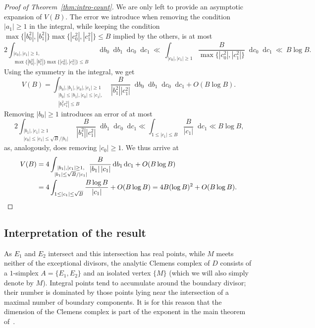 \documentclass[a4paper, twoside, 10pt]{amsart}
\newcommand*\diff{\mathop{}\!\mathrm{d}}
\newcommand{\abs}[1]{\left\lvert#1\right\rvert}
\theoremstyle{definition}
\begin{document}
\begin{proof}[Proof of Theorem~\ref{thm:intro-count}]
  We are only left to provide an asymptotic expansion of $V(B)$. The error we introduce when removing the condition $\abs{a_1}\geq 1$ in the integral, while keeping the condition $\max\{\abs{b_0^2},\abs{b_1^2}\}\max\{\abs{c_0^2},\abs{c_1^2}\}\leq B$ implied by the others, is at most
  \begin{equation*}
    2\int_{\substack{\abs{c_0},\abs{c_1} \geq 1,\\ \max\{\abs{b_0^2},\abs{b_1^2}\}\max\{\abs{c_0^2},\abs{c_1^2}\}\leq B}} \diff b_0 \diff b_1 \diff c_0 \diff c_1
    \ \ll\ 
    \int_{\abs{c_0},\abs{c_1}\geq 1} \frac{B}{\max\{\abs{c_0^2},\abs{c_1^2}\}} \diff c_0 \diff c_1
    \ \ll\ 
     B\log B\text{.}
  \end{equation*}
  Using the symmetry in the integral, we get
  \[
    V(B)= \int_{\substack{\abs{b_0},\abs{b_1}, \abs{c_0}, \abs{c_1} \geq 1 \\ \abs{b_0}\leq \abs{b_1}, \abs{c_0} \leq \abs{c_1}, \\ \abs{b_1^2c_1^2}\leq B }} \frac{B}{\abs{b_1^2}\abs{c_1^2}} \diff b_0 \diff b_1 \diff c_0 \diff c_1 + O(B\log B) \text{.}
  \]
  Removing $\abs{b_0}\geq 1$ introduces an error of at most
  \[
    2 \int_{\substack{\abs{b_1},\abs{c_1}\geq 1\\\abs{c_0}\leq \abs{c_1}\leq \sqrt{B}/\abs{b_1}}}
    \frac{B}{\abs{b_1^2}\abs{c_1^2}} \diff b_1 \diff c_0 \diff c_1
    \ll \int_{1\leq\abs{c_1}\leq B} \frac{B}{\abs{c_1}} \diff c_1
    \ll B \log B\text{,}
  \]
  as, analogously, does removing $\abs{c_0}\geq 1$.
  We thus arrive at
  \begin{align*}
    V(B)
    &=4\int_{\substack{\abs{b_1},\abs{c_1}\geq 1,\\\abs{b_1}\leq \sqrt{B}/\abs{c_1}}} \frac{B}{\abs{b_1}\abs{c_1}} \diff b_1 \diff c_1 + O(B\log B)\\
    &=4 \int_{1\leq \abs{c_1} \leq \sqrt{B}} \frac{B\log B}{\abs{c_1}} + O(B\log B)
    =4 B (\log B)^2 + O(B\log B)\text{.}\qedhere
  \end{align*}
\end{proof}


\subsection{Interpretation of the result}\label{ssec:toric-interpretation}

As $E_1$ and $E_2$ intersect and this intersection has real points, while $M$ meets neither of the exceptional divisors, the analytic Clemens complex of $D$ consists of a $1$-simplex $A=\{E_1, E_2\}$ and an isolated vertex $\{M\}$ (which we will also simply denote by $M$). Integral points tend to accumulate around the boundary divisor; their number is dominated by those points lying near the intersection of a maximal number of boundary components. It is for this reason that the dimension of the Clemens complex is part of the exponent in the main theorem of~\cite{arXiv:1006.3345}.
\end{document}
